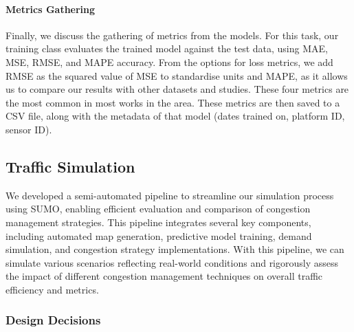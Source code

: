 \paragraph{Metrics Gathering}
Finally, we discuss the gathering of metrics from the models. For this task, our training class evaluates the trained model against the test data, using MAE, MSE, RMSE, and MAPE accuracy. From the options for loss metrics, we add RMSE as the squared value of MSE to standardise units and MAPE, as it allows us to compare our results with other datasets and studies. These four metrics are the most common in most works in the area. These metrics are then saved to a CSV file, along with the metadata of that model (dates trained on, platform ID, sensor ID).

\subsection{Traffic Simulation}
We developed a semi-automated pipeline to streamline our simulation process using SUMO, enabling efficient evaluation and comparison of congestion management strategies. This pipeline integrates several key components, including automated map generation, predictive model training, demand simulation, and congestion strategy implementations. With this pipeline, we can simulate various scenarios reflecting real-world conditions and rigorously assess the impact of different congestion management techniques on overall traffic efficiency and metrics.

\subsubsection{Design Decisions}
\label{link:sim-design-decisions}
